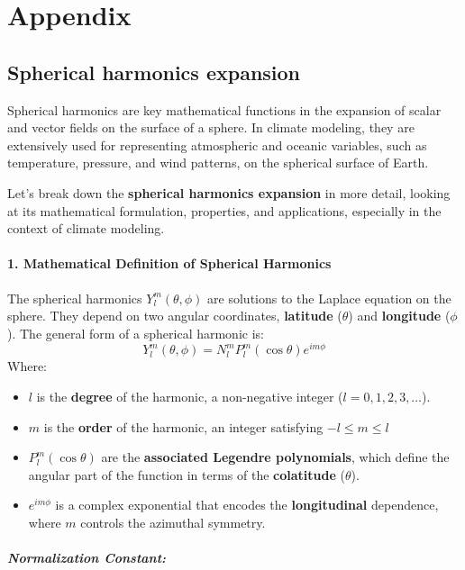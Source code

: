 \appendix

\chapter{Appendix}\label{ch:appendixA}

\section{Spherical harmonics expansion}

Spherical harmonics are key mathematical functions in the expansion of scalar and vector fields on the surface of a sphere. In climate modeling, they are extensively used for representing atmospheric and oceanic variables, such as temperature, pressure, and wind patterns, on the spherical surface of Earth.


Let's break down the \textbf{spherical harmonics expansion} in more detail, looking at its mathematical formulation, properties, and applications, especially in the context of climate modeling.

\subsubsection{1. \textbf{Mathematical Definition of Spherical Harmonics}}

The spherical harmonics $Y_l^m(\theta, \phi)$ are solutions to the Laplace equation on the sphere. They depend on two angular coordinates, \textbf{latitude} ($\theta$) and \textbf{longitude} ($\phi$).
The general form of a spherical harmonic is:
$$Y_l^m(\theta,\phi)=N_l^mP_l^m(\cos\theta)e^{im\phi}$$
Where:
\begin{itemize}
	\item $l$ is the \textbf{degree} of the harmonic, a non-negative integer ($l=0,1,2,3,…$).
	\item  $m$ is the \textbf{order} of the harmonic, an integer satisfying $-l\leq m\leq l$
	\item $P_l^m(\cos\theta)$ are the \textbf{associated Legendre polynomials}, which define the angular part of the function in terms of the \textbf{colatitude} ($\theta$).
	\item $e^{im\phi}$ is a complex exponential that encodes the \textbf{longitudinal} dependence, where $m$ controls the azimuthal symmetry.
\end{itemize}

\paragraph{\textbf{Normalization Constant}:}

